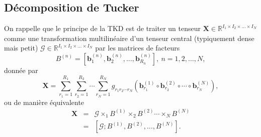 \documentclass[11pt,a4paper,oneside]{book}
\def\b{\mathbf b}
\def\RItn{\mathbb{R}^{I_1 \times I_2 \times \ldots \times I_N}}
\newcommand{\mbf}[1]{\mathbf{#1}}
\begin{document}
\subsection{Décomposition de Tucker}
On rappelle que le principe de la TKD est de traiter un tenseur $ \mbf{X}\in\RItn $ comme une transformation multilinéaire d'un tenseur central (typiquement dense mais petit) $ \mathcal{G}\in\RItn $ par les matrices de facteurs 
$$ B^{(n)}=\left[\b_{1}^{(n)},\b_{2}^{(n)},\dots,\b_{R_{n}}^{(n)}\right],\: n=1,2,\dots,N, $$ donnée par
\begin{equation}\label{3TKD}
\mbf{X}=\sum_{r_{1}=1}^{R_{1}}\sum_{r_{2}=1}^{R_{2}}\cdots\sum_{r_{N}=1}^{R_{N}}g_{r_{1}r_{2}\cdots r_{N}}\left(\b_{r_{1}}^{(1)}\circ\b_{r_{2}}^{(2)}\circ\cdots\circ\b_{r_{N}}^{(N)}\right),
\end{equation}
ou de manière équivalente
\begin{eqnarray}
\mbf{X}&=&\mathcal{G}\times_{1}B^{(1)}\times_{2}B^{(2)}\cdots\times_{N}B^{(N)}\nonumber\\
&=&\left[\mathcal{G};B^{(1)},B^{(2)},\dots,B^{(N)}\right].\label{TKD8}
\end{eqnarray}
\end{document}
